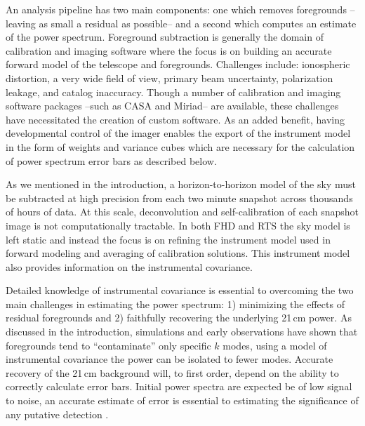 \documentclass[twolcolumn,iop]{emulateapj}
\begin{document}
An analysis pipeline has two main components: one which removes foregrounds --leaving as small a residual as possible-- and a second which computes an estimate of the power spectrum.   Foreground subtraction is generally the domain of calibration and imaging software where the focus is on building an accurate forward model of the telescope and foregrounds.  Challenges include: ionospheric distortion, a very wide field of view, primary beam uncertainty, polarization leakage, and catalog inaccuracy. Though a number of calibration and imaging software packages --such as CASA and Miriad-- are available, these challenges have necessitated the creation of custom software.  As an added benefit, having developmental control of the imager enables the export of the instrument model in the form of weights and variance cubes which are necessary for the calculation of power spectrum error bars as described below. 

As we mentioned in the introduction, a horizon-to-horizon model of the sky must be subtracted at high precision from each two minute snapshot across thousands of hours of data. At this scale, deconvolution and self-calibration of each snapshot image is not computationally tractable.  In both FHD and RTS the sky model is left static and instead the focus is on refining the instrument model used in forward modeling and averaging of calibration solutions.  This instrument model also provides information on the instrumental covariance.


Detailed knowledge of instrumental covariance is essential to overcoming the two main challenges in estimating the power spectrum: 1) minimizing the effects of residual foregrounds and 2) faithfully recovering the underlying 21\,cm power.   As discussed in the introduction, simulations and early observations have shown that foregrounds tend to ``contaminate'' only specific $k$ modes, using a model of instrumental covariance the power can be isolated to fewer modes.  Accurate recovery of the 21\,cm background will, to first order, depend on the ability to correctly calculate error bars.  Initial power spectra are expected be of low signal to noise, an accurate estimate of error is essential to estimating the significance of any putative detection \citep{Pober:2014p10390,Beardsley:2013p9952}. 
\end{document}
